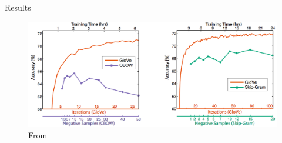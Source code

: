 \begin{frame}{Results}
    \begin{figure}
      \includegraphics[scale=0.27]{images/gloveVSword2vec.png}
      \caption{From}
    \end{figure}
\end{frame}

